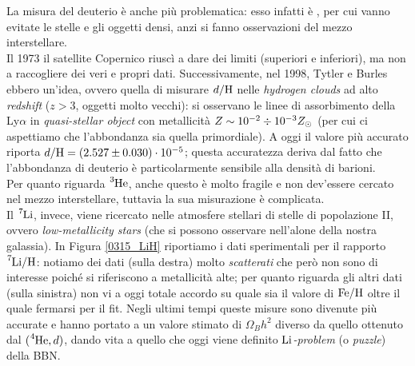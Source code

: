 \noindent La misura del deuterio è anche più problematica: esso infatti è , per cui vanno evitate le stelle e gli oggetti densi, anzi si fanno osservazioni del mezzo interstellare.\\
Il 1973 il satellite Copernico riuscì a dare dei limiti (superiori e inferiori), ma non a raccogliere dei veri e propri dati. Successivamente, nel 1998, Tytler e Burles ebbero un'idea, ovvero quella di misurare $d/\ce{H}$ nelle \textit{hydrogen clouds} ad alto \textit{redshift} ($z>3$, oggetti molto vecchi): si osservano le linee di assorbimento della Ly$\alpha$ in \textit{quasi-stellar object} con metallicità $Z \sim 10^{-2}\div10^{-3} Z_{\odot}{}$ (per cui ci aspettiamo che l'abbondanza sia quella primordiale). A oggi il valore più accurato riporta $d/\ce{H} = (2.527 \pm 0.030)\cdot\ord{-5}$; questa accuratezza deriva dal fatto che l'abbondanza di deuterio è particolarmente sensibile alla densità di barioni.\\
Per quanto riguarda $\ce{^3He}$, anche questo è molto fragile e non dev'essere cercato nel mezzo interstellare, tuttavia la sua misurazione è complicata.\\
Il $\ce{^7Li}$, invece, viene ricercato nelle atmosfere stellari di stelle di popolazione II, ovvero \textit{low-metallicity stars} (che si possono osservare nell'alone della nostra galassia). In Figura \ref{0315_LiH} riportiamo i dati sperimentali per il rapporto $\ce{^7Li}/\ce{H}$: notiamo dei dati (sulla destra) molto \textit{scatterati} che però non sono di interesse poiché si riferiscono a metallicità alte; per quanto riguarda gli altri dati (sulla sinistra) non vi a oggi totale accordo su quale sia il valore di $\ce{Fe}/\ce{H}$ oltre il quale fermarsi per il fit. Negli ultimi tempi queste misure sono divenute più accurate e hanno portato a un valore stimato di $\Omega_B h^2$ diverso da quello ottenuto dal $(\ce{^4He},d)$, dando vita a quello che oggi viene definito \textit{$\ce{Li}$-problem} (o \textit{puzzle}) della BBN.

